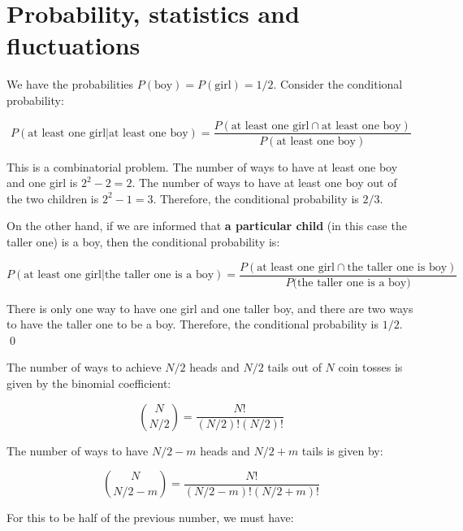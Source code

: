\documentclass[12pt]{article}
\begin{document}



\pagebreak
\section*{Probability, statistics and fluctuations}


We have the probabilities $P(\text{boy}) = P(\text{girl}) = 1/2$. Consider the conditional probability:

\begin{equation}
    P(\text{at least one girl} | \text{at least one boy}) = \frac{P(\text{at least one girl} \cap \text{at least one boy})}{P(\text{at least one boy})}
\end{equation}

This is a combinatorial problem. The number of ways to have at least one boy and one girl is $2^2 - 2 = 2$. The number of ways to have at least one boy out of the two children is $2^2 - 1 = 3$. Therefore, the conditional probability is $2/3$.

On the other hand, if we are informed that \textbf{a particular child} (in this case the taller one) is a boy, then the conditional probability is:

\begin{equation}
    P(\text{at least one girl} | \text{the taller one is a boy}) = \frac{P(\text{at least one girl} \cap \text{the taller one is boy})}{P(\text{the taller one is a boy)}}
\end{equation}

There is only one way to have one girl and one taller boy, and there are two ways to have the taller one to be a boy. Therefore, the conditional probability is $1/2$.
\qed


The number of ways to achieve $N/2$ heads and $N/2$ tails out of $N$ coin tosses is given by the binomial coefficient:

\begin{equation}
    \binom{N}{N/2} = \frac{N!}{(N/2)!(N/2)!}
\end{equation}

The number of ways to have $N/2 - m$ heads and $N/2 + m$ tails is given by:

\begin{equation}
    \binom{N}{N/2 - m} = \frac{N!}{(N/2 - m)!(N/2 + m)!}
\end{equation}

For this to be half of the previous number, we must have:
\end{document}
